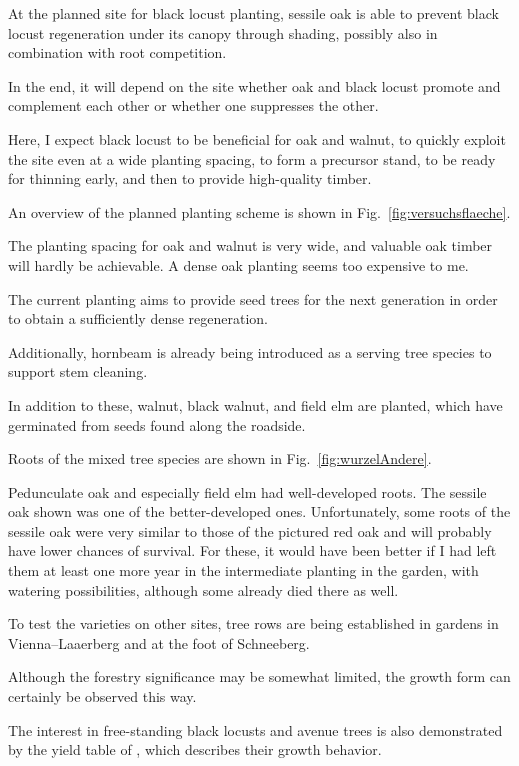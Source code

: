 At the planned site for black locust planting, sessile oak is able to prevent black locust regeneration under its canopy through shading, possibly also in combination with root competition.

In the end, it will depend on the site whether oak and black locust promote and complement each other or whether one suppresses the other.

Here, I expect black locust to be beneficial for oak and walnut, to quickly exploit the site even at a wide planting spacing, to form a precursor stand, to be ready for thinning early, and then to provide high-quality timber.

An overview of the planned planting scheme is shown in Fig.~\ref{fig:versuchsflaeche}.


The planting spacing for oak and walnut is very wide, and valuable oak timber will hardly be achievable. A dense oak planting seems too expensive to me.

The current planting aims to provide seed trees for the next generation in order to obtain a sufficiently dense regeneration.

Additionally, hornbeam is already being introduced as a serving tree species to support stem cleaning.

In addition to these, walnut, black walnut, and field elm are planted, which have germinated from seeds found along the roadside.

Roots of the mixed tree species are shown in Fig.~\ref{fig:wurzelAndere}.

Pedunculate oak and especially field elm had well-developed roots. The sessile oak shown was one of the better-developed ones. Unfortunately, some roots of the sessile oak were very similar to those of the pictured red oak and will probably have lower chances of survival. For these, it would have been better if I had left them at least one more year in the intermediate planting in the garden, with watering possibilities, although some already died there as well.


To test the varieties on other sites, tree rows are being established in gardens in Vienna–Laaerberg and at the foot of Schneeberg.

Although the forestry significance may be somewhat limited, the growth form can certainly be observed this way.

The interest in free-standing black locusts and avenue trees is also demonstrated by the yield table of \citet{fekete1931robinieErtragstafel}, which describes their growth behavior.

